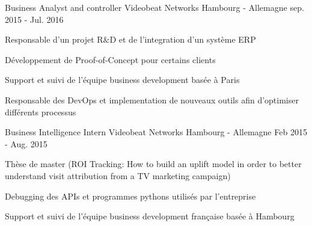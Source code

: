 

\begin{cventries}

  \cventry
    {Business Analyst and controller} %
    {Videobeat Networks} %
    {Hambourg - Allemagne} %
    {sep. 2015 - Jul. 2016} %
    {
      \begin{cvitems} %
        \item {Responsable d'un projet R\&D et de l'integration d'un système ERP}
        \item {Développement de Proof-of-Concept pour certains clients}
        \item {Support et suivi de l'équipe business development basée à Paris}
        \item {Responsable des DevOps et implementation de nouveaux outils afin d'optimiser différents processus}
      \end{cvitems}
    }

  \cventry
    {Business Intelligence Intern} %
    {Videobeat Networks} %
    {Hambourg - Allemagne} %
    {Feb 2015 - Aug. 2015} %
    {
      \begin{cvitems} %
        \item {Thèse de master (ROI Tracking: How to build an uplift model in order to better understand visit attribution from a TV marketing campaign)}
        \item {Debugging des APIs et programmes pythons utilisés par l'entreprise}
        \item {Support et suivi de l'équipe business development française basée à Hambourg}
      \end{cvitems}
    }


\end{cventries}
